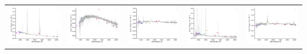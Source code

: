 \begin{center}
\begin{longtable}{l l l l l }
    \includegraphics[width=0.19\linewidth, clip]{Figs/Figs-sdss/spec-2636-54082-0584-STRIPE82-0054-038222.pdf} & \includegraphics[width=0.19\linewidth, clip]{Figs/Figs-sdss/spec-2892-54552-0550-SPLUS-n01s24-037959.pdf} & \includegraphics[width=0.19\linewidth, clip]{Figs/Figs-sdss/spec-3587-55182-0140-STRIPE82-0015-024713.pdf} & \includegraphics[width=0.19\linewidth, clip]{Figs/Figs-sdss/spec-3588-55184-0604-STRIPE82-0016-029684.pdf} & \includegraphics[width=0.19\linewidth, clip]{Figs/Figs-sdss/spec-3589-55186-0260-STRIPE82-0017-024243.pdf} \\

\end{longtable}
\end{center}
